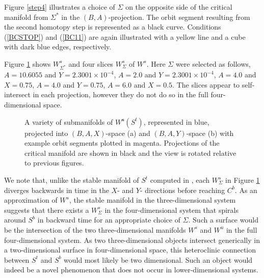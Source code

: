\documentclass{ws-ijbc}
\begin{document}
Figure \ref{step4} illustrates a choice of $\Sigma$ on the opposite side of the critical manifold from $\Sigma^*$ in the $(B,A)$-projection.  The orbit segment resulting from the second homotopy step is represented as a black curve.  Conditions (\ref{BCSTOP}) and (\ref{BC11}) are again illustrated with a yellow line and a cube with dark blue edges, respectively.
    
Figure \ref{pieces} shows $W^s_{\Sigma^*}$ and four slices $W^{s}_{\Sigma}$ of $W^{s}$.  Here $\Sigma$ were selected as follows, $A=10.6055$ and $Y=2.3001 \times 10^{-4}$, $A=2.0$ and $Y=2.3001 \times 10^{-4}$, $A=4.0$ and $X=0.75$, $A=4.0$ and $Y=0.75$, $A=6.0$ and $X=0.5$.  The slices appear to self-intersect in each projection, however they do not do so in the full four-dimensional space.  

\begin{figure}[h]
\centering
{}
\caption{A variety of submanifolds of $W^{\mathbf{s}}(S^t)$, represented in blue, projected into $(B,A,X)$-space (a) and $(B,A,Y)$-space (b) with example orbit segments plotted in magenta.  Projections of the critical manifold are shown in black and the view is rotated relative to previous figures.}
\label{pieces}
\end{figure}
    
We note that, unlike the stable manifold of $S^t$ computed in \cite{QSSA}, each $W^{s}_{\Sigma}$ in Figure \ref{pieces} diverges backwards in time in the $X$- and $Y$- directions before reaching $C^b$.  As an approximation of $W^s$, the stable manifold in the three-dimensional system suggests that there exists a $W^{s}_{\Sigma}$ in the four-dimensional system that spirals around $S^b$ in backward time for an appropriate choice of $\Sigma$.  Such a surface would be the intersection of the two three-dimensional manifolds $W^s$ and $W^u$ in the full four-dimensional system.  As two three-dimensional objects intersect generically in a two-dimensional surface in four-dimensional space, this heteroclinic connection between $S^t$ and $S^b$ would most likely be two dimensional.  Such an object would indeed be a novel phenomenon that does not occur in lower-dimensional systems.
\end{document}
